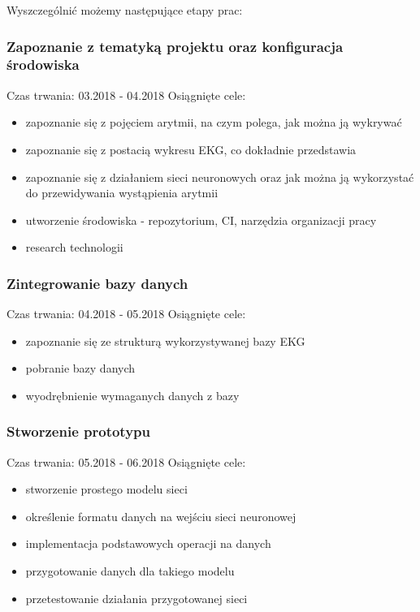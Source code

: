 \documentclass[polish,12pt]{aghthesis}
\begin{document}
Wyszczególnić możemy następujące etapy prac:

\subsubsection{Zapoznanie z tematyką projektu oraz konfiguracja środowiska}

Czas trwania: 03.2018 - 04.2018
\newline
Osiągnięte cele:
\begin{itemize}
	\item zapoznanie się z pojęciem arytmii, na czym polega, jak można ją wykrywać
	\item zapoznanie się z postacią wykresu EKG, co dokładnie przedstawia
	\item zapoznanie się z działaniem sieci neuronowych oraz jak można ją wykorzystać do przewidywania wystąpienia arytmii
	\item utworzenie środowiska - repozytorium, CI, narzędzia organizacji pracy
	\item research technologii
\end{itemize}

\subsubsection{Zintegrowanie bazy danych}

Czas trwania: 04.2018 - 05.2018
\newline
Osiągnięte cele:
\begin{itemize}
	\item zapoznanie się ze strukturą wykorzystywanej bazy EKG
	\item pobranie bazy danych
	\item wyodrębnienie wymaganych danych z bazy
\end{itemize}

\subsubsection{Stworzenie prototypu}

Czas trwania: 05.2018 - 06.2018
\newline
Osiągnięte cele:
\begin{itemize}
	\item stworzenie prostego modelu sieci
	\item określenie formatu danych na wejściu sieci neuronowej
	\item implementacja podstawowych operacji na danych
	\item przygotowanie danych dla takiego modelu
	\item przetestowanie działania przygotowanej sieci
\end{itemize}
\end{document}

